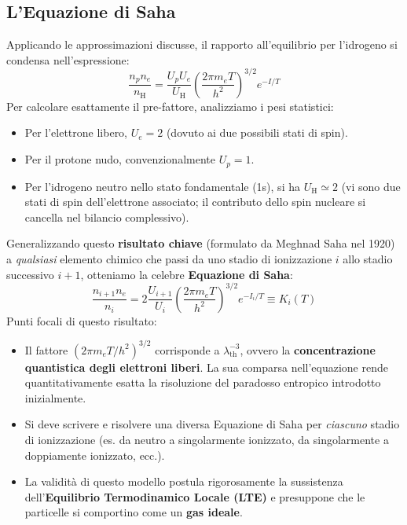 \subsection{L'Equazione di Saha}
Applicando le approssimazioni discusse, il rapporto all'equilibrio per l'idrogeno si condensa nell'espressione:
\begin{equation}
\frac{n_p n_e}{n_{\text{H}}} = \frac{U_p U_e}{U_{\text{H}}} \left( \frac{2\pi m_e T}{h^2} \right)^{3/2} e^{-I/T}
\end{equation}
Per calcolare esattamente il pre-fattore, analizziamo i pesi statistici:
\begin{itemize}
\item Per l'elettrone libero, $U_e = 2$ (dovuto ai due possibili stati di spin).
\item Per il protone nudo, convenzionalmente $U_p = 1$.
\item Per l'idrogeno neutro nello stato fondamentale (1s), si ha $U_{\text{H}} \simeq 2$ (vi sono due stati di spin dell'elettrone associato; il contributo dello spin nucleare si cancella nel bilancio complessivo).
\end{itemize}

Generalizzando questo \textbf{risultato chiave} (formulato da Meghnad Saha nel 1920) a \textit{qualsiasi} elemento chimico che passi da uno stadio di ionizzazione $i$ allo stadio successivo $i+1$, otteniamo la celebre \textbf{Equazione di Saha}:
\begin{equation}
\frac{n_{i+1} n_e}{n_i} = 2 \frac{U_{i+1}}{U_i} \left( \frac{2\pi m_e T}{h^2} \right)^{3/2} e^{-I_i/T} \equiv K_i(T)
\end{equation}
Punti focali di questo risultato:
\begin{itemize}
\item Il fattore $(2\pi m_e T/h^2)^{3/2}$ corrisponde a $\lambda_{\text{th}}^{-3}$, ovvero la \textbf{concentrazione quantistica degli elettroni liberi}. La sua comparsa nell'equazione rende quantitativamente esatta la risoluzione del paradosso entropico introdotto inizialmente.
\item Si deve scrivere e risolvere una diversa Equazione di Saha per \textit{ciascuno} stadio di ionizzazione (es. da neutro a singolarmente ionizzato, da singolarmente a doppiamente ionizzato, ecc.).
\item La validità di questo modello postula rigorosamente la sussistenza dell'\textbf{Equilibrio Termodinamico Locale (LTE)} e presuppone che le particelle si comportino come un \textbf{gas ideale}.
\end{itemize}

